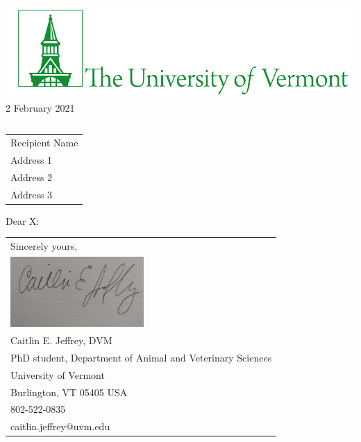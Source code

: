\documentclass[10pt]{article} %
\begin{document}

\raggedright %
\includegraphics[scale=2]{UVMLogoOutline_7484H_1000w.jpg}\\ %

 \hfill\hfill\hfill %
 2 February 2021\\[10pt]  %
 
\begin{tabular}{l@{}}
\end{tabular}

\begin{tabular}{@{}l}
Recipient Name\\
Address 1\\
Address 2\\
Address 3
\end{tabular}


Dear X:

\lipsum[1-2]





\begin{tabular}{@{}l}
Sincerely yours,\\
\includegraphics[scale=0.15,width=2in]{caitlin_sig.jpg}\\
Caitlin E. Jeffrey, DVM\\
PhD student, Department of Animal and Veterinary Sciences\\
University of Vermont\\
Burlington, VT 05405 USA\\
802-522-0835\\
caitlin.jeffrey@uvm.edu\\
\end{tabular}
\end{document}
